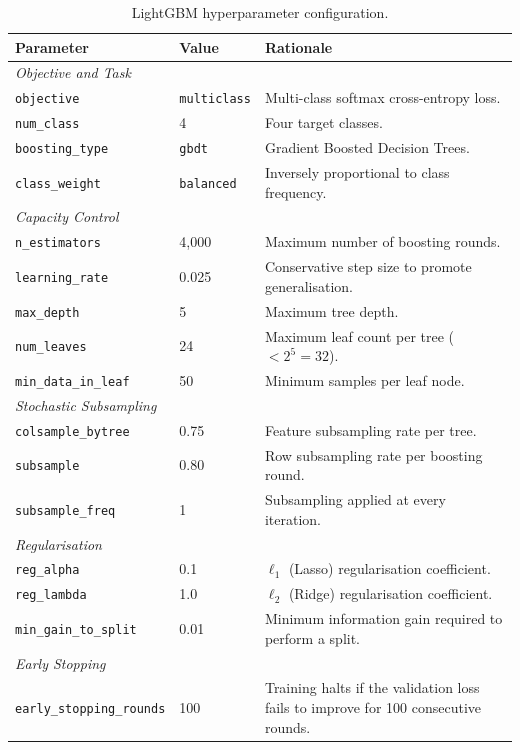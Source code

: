 \documentclass[a4paper,12pt]{article}
\begin{document}
\begin{table}[H]
\centering
\caption{LightGBM hyperparameter configuration.}
\label{tab:hyperparams}
\begin{tabular}{llp{6.2cm}}
\toprule
\textbf{Parameter} & \textbf{Value} & \textbf{Rationale} \\
\midrule
\multicolumn{3}{l}{\textit{Objective and Task}} \\
\texttt{objective}       & \texttt{multiclass}  & Multi-class softmax cross-entropy loss. \\
\texttt{num\_class}      & 4           & Four target classes. \\
\texttt{boosting\_type}  & \texttt{gbdt}        & Gradient Boosted Decision Trees. \\
\texttt{class\_weight}   & \texttt{balanced}    & Inversely proportional to class frequency. \\
\midrule
\multicolumn{3}{l}{\textit{Capacity Control}} \\
\texttt{n\_estimators}       & 4{,}000 & Maximum number of boosting rounds. \\
\texttt{learning\_rate}      & 0.025   & Conservative step size to promote generalisation. \\
\texttt{max\_depth}          & 5       & Maximum tree depth. \\
\texttt{num\_leaves}         & 24      & Maximum leaf count per tree ($< 2^5 = 32$). \\
\texttt{min\_data\_in\_leaf} & 50      & Minimum samples per leaf node. \\
\midrule
\multicolumn{3}{l}{\textit{Stochastic Subsampling}} \\
\texttt{colsample\_bytree} & 0.75 & Feature subsampling rate per tree. \\
\texttt{subsample}         & 0.80 & Row subsampling rate per boosting round. \\
\texttt{subsample\_freq}   & 1    & Subsampling applied at every iteration. \\
\midrule
\multicolumn{3}{l}{\textit{Regularisation}} \\
\texttt{reg\_alpha}           & 0.1  & $\ell_1$ (Lasso) regularisation coefficient. \\
\texttt{reg\_lambda}          & 1.0  & $\ell_2$ (Ridge) regularisation coefficient. \\
\texttt{min\_gain\_to\_split} & 0.01 & Minimum information gain required to perform a split. \\
\midrule
\multicolumn{3}{l}{\textit{Early Stopping}} \\
\texttt{early\_stopping\_rounds} & 100 & Training halts if the validation loss fails to improve for 100 consecutive rounds. \\
\bottomrule
\end{tabular}
\end{table}
\end{document}
